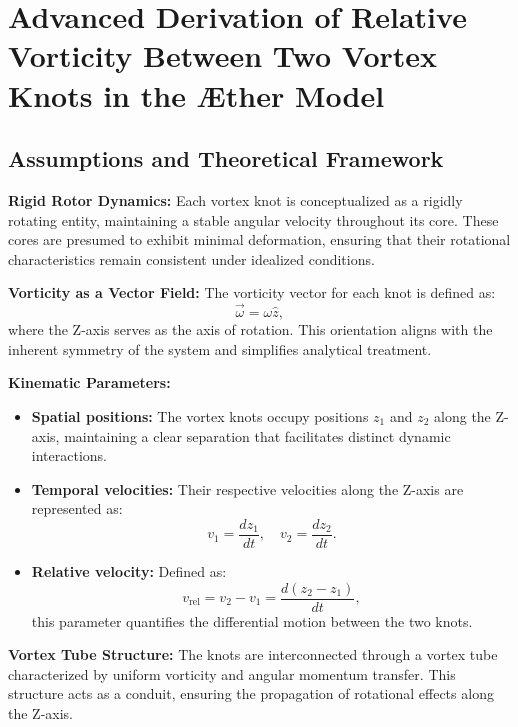 \documentclass[a4paper,10pt]{article}
\begin{document}
    

    \section{Advanced Derivation of Relative Vorticity Between Two Vortex Knots in the Æther Model}

    \subsection*{Assumptions and Theoretical Framework}
    \textbf{Rigid Rotor Dynamics:} Each vortex knot is conceptualized as a rigidly rotating entity, maintaining a stable angular velocity throughout its core. These cores are presumed to exhibit minimal deformation, ensuring that their rotational characteristics remain consistent under idealized conditions.

    \textbf{Vorticity as a Vector Field:} The vorticity vector for each knot is defined as:
    \begin{equation*}
        \vec{\omega} = \omega \hat{z},
    \end{equation*}
    where the Z-axis serves as the axis of rotation. This orientation aligns with the inherent symmetry of the system and simplifies analytical treatment.

    \textbf{Kinematic Parameters:}
    \begin{itemize}
        \item \textbf{Spatial positions:} The vortex knots occupy positions $z_1$ and $z_2$ along the Z-axis, maintaining a clear separation that facilitates distinct dynamic interactions.
        \item \textbf{Temporal velocities:} Their respective velocities along the Z-axis are represented as:
        \begin{equation*}
            v_1 = \frac{dz_1}{dt}, \quad v_2 = \frac{dz_2}{dt}.
        \end{equation*}
        \item \textbf{Relative velocity:} Defined as:
        \begin{equation*}
            v_\text{rel} = v_2 - v_1 = \frac{d(z_2 - z_1)}{dt},
        \end{equation*}
        this parameter quantifies the differential motion between the two knots.
    \end{itemize}

    \textbf{Vortex Tube Structure:} The knots are interconnected through a vortex tube characterized by uniform vorticity and angular momentum transfer. This structure acts as a conduit, ensuring the propagation of rotational effects along the Z-axis.
\end{document}
